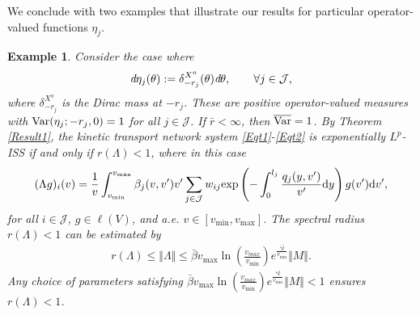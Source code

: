 \documentclass[onecolumn]{autart}
\newtheorem{example}{Example}[section]
\numberwithin{equation}{section}
\begin{document}
	
	We conclude with two examples that illustrate our results for particular operator-valued functions $\eta_j$.
	\begin{example}
		Consider the case where
		\begin{align*}
			\emph{d}\eta_j(\theta):=\delta_{-r_j}^{X^o}(\theta)\emph{d}\theta,\qquad \forall j\in \mathcal{J},
		\end{align*}
        where {$\delta_{-r_j}^{X^o}$ is the Dirac mass at $-r_j$}. These are positive operator-valued measures with ${{\rm Var}}(\eta_j;-r_{j},0)=1$ for all $j\in \mathcal{J}$.  If $\bar{r}<\infty$, then $\overline{{\rm Var}}=1$. By Theorem \ref{Result1}, the kinetic transport network system \eqref{Eqt1}-\eqref{Eqt2} is exponentially $L^p$-ISS if and only if $r(\Lambda)<1$, where in this case
		\begin{align*}
			(\Lambda g)_i(v)=\frac{1}{v}\int_{v_{\min}}^{v_{\max}}\beta_j(v,v')v'\sum_{j\in \mathcal{J}}w_{ij}
			{{\exp}}\left(-\int_0^{l_j} \frac{ q_j(y,v')}{v'} {\rm d}y  \right)g(v'){\rm d}v',
		\end{align*}
		for all $i\in \mathcal{J}$, $g\in {\bm \ell}(V)$, and a.e. $v\in [v_{\min},v_{\max}]$. The spectral radius $r(\Lambda)<1$ can be estimated by
		\begin{align*}
			r(\Lambda)\le \Vert \Lambda\Vert\le \bar{\beta}v_{\max}\ln\left(\frac{v_{max}}{v_{\min}}\right)e^{\frac{\bar{\gamma}\bar{l}}{v_{\min}}}\Vert M \Vert.
		\end{align*}
		Any choice of parameters satisfying $	\bar{\beta}v_{\max}\ln(\frac{v_{max}}{v_{\min}})e^{\frac{\bar{\gamma}\bar{l}}{v_{\min}}}\Vert M \Vert<1$
		ensures $r(\Lambda)<1$.
	\end{example}
	
\end{document}
